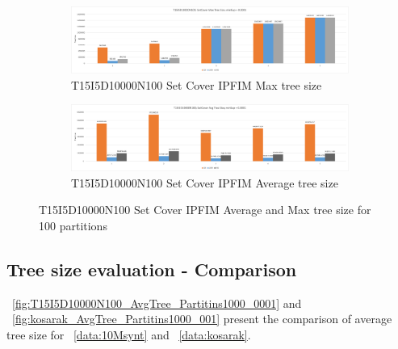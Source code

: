 \begin{figure}
  \centering
  \begin{subfigure}{\linewidth}
  \centering
  \includegraphics[width=\linewidth ,height=\textheight, keepaspectratio]{figures/4iterations/T15I5D10000N100_MaxTree_SetCover_0001}
  \caption{T15I5D10000N100 Set Cover IPFIM Max tree size}
  \label{fig:T15I5D10000N100_MaxTree_SetCover_0001}
\end{subfigure}
  \begin{subfigure}{\linewidth}
  \centering
  \includegraphics[width=\linewidth ,height=\textheight, keepaspectratio]{figures/4iterations/T15I5D10000N100_AvgTree_SetCover_0001}
  \caption{T15I5D10000N100 Set Cover IPFIM Average tree size}
  \label{fig:T15I5D10000N100_AvgTree_SetCover_0001}
\end{subfigure}
\caption{T15I5D10000N100 Set Cover IPFIM Average and Max tree size for 100 partitions}
\end{figure}

\subsection{Tree size evaluation - Comparison}
~\autoref{fig:T15I5D10000N100_AvgTree_Partitins1000_0001} and ~\autoref{fig:kosarak_AvgTree_Partitins1000_001} present the comparison of average tree size for ~\autoref{data:10Msynt} and ~\autoref{data:kosarak}. 



